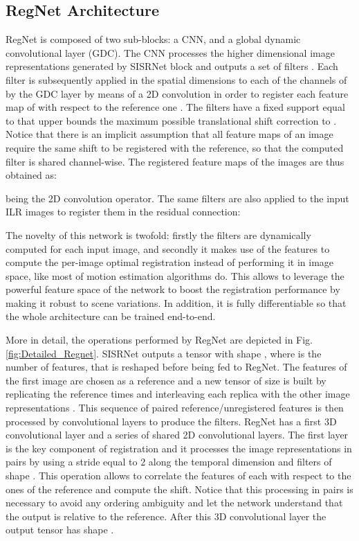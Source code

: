 \documentclass[journal]{IEEEtran}
\begin{document}
\subsection{RegNet Architecture} \label{sec:regnet_arch}

RegNet is composed of two sub-blocks: a CNN, and a global dynamic convolutional layer (GDC).
The CNN processes the higher dimensional image representations  generated by SISRNet block and outputs a set of  filters . Each filter  is subsequently applied in the spatial dimensions to each of the channels of  by the GDC layer by means of a 2D convolution in order to register each feature map of  with respect to the reference one . The filters  have a fixed support equal to  that upper bounds the maximum possible translational shift correction to . Notice that there is an implicit assumption that all feature maps of an image require the same shift to be registered with the reference, so that the computed filter is shared channel-wise. The registered feature maps  of the  images are thus obtained as:


being  the 2D convolution operator. The same filters are also applied to the input ILR images to register them in the residual connection:


The novelty of this network is twofold: firstly the filters are dynamically computed for each input image, and secondly it makes use of the features to compute the per-image optimal registration instead of performing it in image space, like most of motion estimation algorithms do. This allows to leverage the powerful feature space of the network to boost the registration performance by making it robust to scene variations. In addition, it is fully differentiable so that the whole architecture can be trained end-to-end.


More in detail, the operations performed by RegNet are depicted in Fig. \ref{fig:Detailed_Regnet}. SISRNet outputs a tensor  with shape  , where  is the number of features, that is reshaped before being fed to RegNet. The features of the first image  are chosen as a reference and a new tensor of size  is built by replicating the reference   times and interleaving each replica with the other  image representations . This sequence of paired reference/unregistered features is then processed by convolutional layers to produce the filters. 
RegNet has a first 3D convolutional layer and a series of shared 2D convolutional layers. The first layer is the key component of registration and it processes the  image representations in pairs by using a stride equal to 2 along the temporal dimension and filters of shape . This operation allows to correlate the features of each   with respect to the ones of the reference  and compute the shift. Notice that this processing in pairs is necessary to avoid any ordering ambiguity and let the network understand that the output is relative to the reference.
After this 3D convolutional layer the output tensor has shape .
\end{document}
